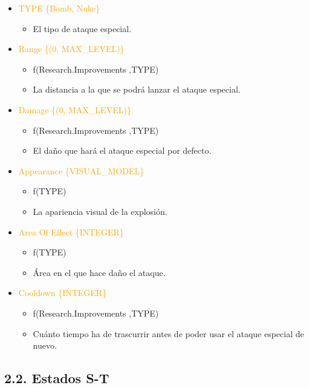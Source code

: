 \documentclass{article}
\begin{document}
\begin{itemize}
    \item \textcolor{Orange}{TYPE \{Bomb, Nuke\}}
    \begin{itemize}
        \item El tipo de ataque especial.
    \end{itemize}
    \item \textcolor{Orange}{Range \{(0, MAX\_LEVEL)\}}
    \begin{itemize}
        \item f(Research.Improvements ,TYPE)
        \item La distancia a la que se podrá lanzar el ataque especial.
    \end{itemize}
    \item \textcolor{Orange}{Damage \{(0, MAX\_LEVEL)\}}
    \begin{itemize}
        \item f(Research.Improvements ,TYPE)
        \item El daño que hará el ataque especial por defecto.
    \end{itemize}
    \item \textcolor{Orange}{Appearance \{VISUAL\_MODEL\}}
    \begin{itemize}
        \item f(TYPE)
        \item La apariencia visual de la explosión.
    \end{itemize}
    \item \textcolor{Orange}{Area Of Effect \{INTEGER\}}
    \begin{itemize}
        \item f(TYPE)
        \item Área en el que hace daño el ataque.
    \end{itemize}
    \item \textcolor{Orange}{Cooldown \{INTEGER\}}
    \begin{itemize}
        \item f(Research.Improvements ,TYPE)
        \item Cuánto tiempo ha de trascurrir antes de poder usar el ataque especial de nuevo.
    \end{itemize}
\end{itemize}

\clearpage

\subsection{2.2. Estados S-T}
\end{document}
